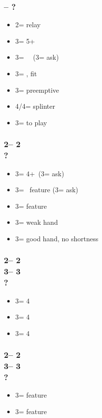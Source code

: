 \documentclass[12pt, a4paper]{report}
\begin{document}
{{        \subsubsection*{\alrts{2\spades} -- ?}
        \begin{itemize}
            \item 2\nt = relay
            \item 3\clubs = 5+\hearts\ \fonce
            \item 3\diams = \minor\ \gf\ (3\hearts = ask)
            \item 3\hearts = \invp, \hearts fit
            \item 3\spades = preemptive
            \item 4\minor/4\hearts = splinter
            \item 3\nt = to play
        \end{itemize}

        \subsubsection*{2\spades -- 2\nt\\
                        ?}
        \begin{itemize}
            \item 3\clubs = 4+\minor\ (3\diams = ask)
            \item 3\diams = \minor\ feature (3\hearts = ask)
            \item 3\hearts = \hearts feature
            \item 3\spades = weak hand
            \item 3\nt = good hand, no shortness
        \end{itemize}

        \subsubsection*{2\spades -- 2\nt\\
                        3\clubs -- 3\diams\\
                        ?}
        \begin{itemize}
            \item 3\hearts = 4\hearts
            \item 3\spades = 4\clubs
            \item 3\nt = 4\diams
        \end{itemize}

        \subsubsection*{2\spades -- 2\nt\\
                        3\diams -- 3\hearts\\
                        ?}
        \begin{itemize}
            \item 3\spades = \clubs feature
            \item 3\nt = \diams feature
        \end{itemize}

}}
\end{document}
